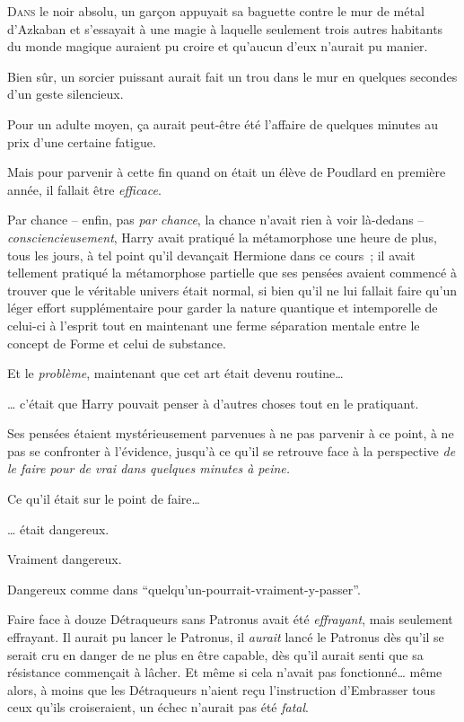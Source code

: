 

\lettrine{D}{ans}  le noir absolu, un garçon appuyait sa baguette contre le mur de métal d'Azkaban et s'essayait à une magie à laquelle seulement trois autres habitants du monde magique auraient pu croire et qu'aucun d'eux n'aurait pu manier.

Bien sûr, un sorcier puissant aurait fait un trou dans le mur en quelques secondes d'un geste silencieux.

Pour un adulte moyen, ça aurait peut-être été l'affaire de quelques minutes au prix d'une certaine fatigue.

Mais pour parvenir à cette fin quand on était un élève de Poudlard en première année, il fallait être \emph{efficace}.

Par chance -- enfin, pas \emph{par chance}, la chance n'avait rien à voir là-dedans -- \emdashhyp\emph{consciencieusement}, Harry avait pratiqué la métamorphose une heure de plus, tous les jours, à tel point qu'il devançait Hermione dans ce cours~; il avait tellement pratiqué la métamorphose partielle que ses pensées avaient commencé à trouver que le véritable univers était normal, si bien qu'il ne lui fallait faire qu'un léger effort supplémentaire pour garder la nature quantique et intemporelle de celui-ci à l'esprit tout en maintenant une ferme séparation mentale entre le concept de Forme et celui de substance.

Et le \emph{problème}, maintenant que cet art était devenu routine…

… c'était que Harry pouvait penser à d'autres choses tout en le pratiquant.

Ses pensées étaient mystérieusement parvenues à ne pas parvenir à ce point, à ne pas se confronter à l'évidence, jusqu'à ce qu'il se retrouve face à la perspective \emph{de le faire pour de vrai dans quelques minutes à peine.}

Ce qu'il était sur le point de faire…

… était dangereux.

Vraiment dangereux.

Dangereux comme dans “quelqu'un-pourrait-vraiment-y-passer”.

Faire face à douze Détraqueurs sans Patronus avait été \emph{effrayant}, mais seulement effrayant.
Il aurait pu lancer le Patronus, il \emph{aurait} lancé le Patronus dès qu'il se serait cru en danger de ne plus en être capable, dès qu'il aurait senti que sa résistance commençait à lâcher.
Et même si cela n'avait pas fonctionné… même alors, à moins que les Détraqueurs n'aient reçu l'instruction d'Embrasser tous ceux qu'ils croiseraient, un échec n'aurait pas été \emph{fatal}.

